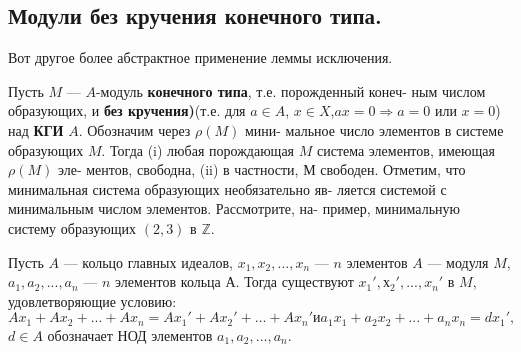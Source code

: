 \subsection{Модули без кручения конечного типа.}
\noindent Вот другое более абстрактное применение леммы исключения.

\begin{predl}
Пусть $M$ — $A$-модуль \textbf{конечного типа}, т.е. порожденный конеч- \linebreak ным числом образующих, и \textbf{без кручения)}(т.е. для $a \in A$, $x \in X$,\linebreak $ax=0 \Rightarrow a=0$ или $x=0$) над \textbf{КГИ} $A$. Обозначим через $\rho(M)$ мини- \linebreak мальное число элементов в системе образующих $M$. Тогда  
(i) любая порождающая $M$ система элементов, имеющая $\rho(M)$ эле- \linebreak ментов, свободна,  
(ii) в частности, $М$ свободен.  \newpage
Отметим, что минимальная система образующих необязательно яв- \linebreak ляется системой с минимальным числом элементов. Рассмотрите, на- \linebreak пример, минимальную систему образующих $(2,3)$ в $\mathbb{Z}$.
\end{predl} 
\begin{lemma}
Пусть $A$ --- кольцо главных идеалов, $x_1, x_2, ..., x_n$ --- $n$ элементов \linebreak $A$ --- модуля $M$, $a_1, a_2, ..., a_n$ --- $n$ элементов кольца $А$. Тогда существуют \linebreak $x_1', х_2', ..., x_n'$ в $M$, удовлетворяющие условию:  
$$Ax_1 + Ax_2 + ... + Ax_n = Ax_1' + Ax_2' + ... + Ax_n' и a_1x_1 + a_2x_2 + ... + a_nx_n = dx_1',$$
$d \in A$ обозначает НОД элементов $a_1, a_2, ..., a_n$.
\end{lemma}

